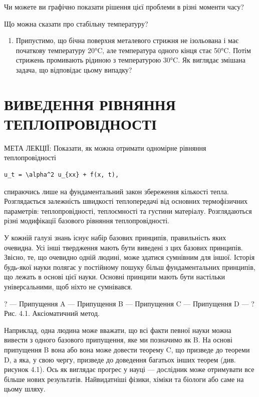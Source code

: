 \documentclass[
  ukrainian,
]{article}
\providecommand{\tightlist}{%
  \setlength{\itemsep}{0pt}\setlength{\parskip}{0pt}}
\begin{document}
Чи можете ви графічно показати рішення цієї проблеми в різні моменти
часу?

Що можна сказати про стабільну температуру?

\begin{enumerate}
\def\labelenumi{\arabic{enumi}.}
\setcounter{enumi}{3}
\tightlist
\item
  Припустимо, що бічна поверхня металевого стрижня не ізольована і має
  початкову температуру 20°C, але температура одного кінця стає 50°C.
  Потім стрижень промивають рідиною з температурою 30°C. Як виглядає
  змішана задача, що відповідає цьому випадку?
\end{enumerate}

\section{ВИВЕДЕННЯ РІВНЯННЯ
ТЕПЛОПРОВІДНОСТІ}\label{ux432ux438ux432ux435ux434ux435ux43dux43dux44f-ux440ux456ux432ux43dux44fux43dux43dux44f-ux442ux435ux43fux43bux43eux43fux440ux43eux432ux456ux434ux43dux43eux441ux442ux456}

МЕТА ЛЕКЦІЇ: Показати, як можна отримати одномірне рівняння
теплопровідності

\begin{verbatim}
u_t = \alpha^2 u_{xx} + f(x, t),
\end{verbatim}

спираючись лише на фундаментальний закон збереження кількості тепла.
Розглядається залежність швидкості теплопередачі від основних
термофізичних параметрів: теплопровідності, теплоємності та густини
матеріалу. Розглядаються різні модифікації базового рівняння
теплопровідності.

У кожній галузі знань існує набір базових принципів, правильність яких
очевидна. Усі інші твердження мають бути виведені з цих базових
принципів. Звісно, те, що очевидно одній людині, може здатися сумнівним
для іншої. Історія будь-якої науки полягає у постійному пошуку більш
фундаментальних принципів, що лежать в основі цієї науки. Основні
принципи мають бути настільки універсальними, щоб ніхто не сумнівався.

? --- Припущення A --- Припущення B --- Припущення C --- Припущення D
--- ? Рис. 4.1. Аксіоматичний метод.

Наприклад, одна людина може вважати, що всі факти певної науки можна
вивести з одного базового припущення, яке ми позначимо як B. На основі
припущення B вона або вона може довести теорему C, що призведе до
теореми D, а яка, у свою чергу, призведе до доведення багатьох інших
теорем (див. рисунок 4.1). Ось як виглядає прогрес у науці --- дослідник
може отримувати все більше нових результатів. Найвидатніші фізики,
хіміки та біологи або саме на цьому шляху.
\end{document}
